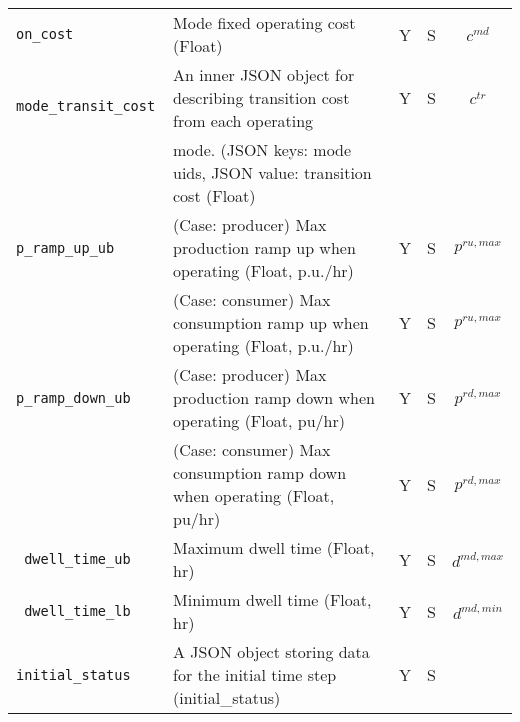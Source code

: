 \documentclass{article}
\begin{document}
\begin{center}
\begin{tabular}{ l | l | c | c | c |}
  {\tt on\_cost} & Mode fixed operating cost (Float) & Y & S & $c^{md}$\\
  {\tt\color{red} mode\_transit\_cost} & An inner JSON object for describing transition cost from each operating  & Y & S & $c^{tr}$ \\
     & mode. (JSON keys: mode uids, JSON value: transition cost (Float) &  &  &  \\
  {\tt p\_ramp\_up\_ub}     & {(Case: producer) Max production ramp up when operating (Float, p.u./hr)} & Y & S & $p^{ru,max}$ \\
                            & {(Case: consumer) Max consumption ramp up when operating (Float, p.u./hr)} & Y & S & $p^{ru,max}$ \\
  {\tt p\_ramp\_down\_ub}   & {(Case: producer) Max production ramp down when operating (Float, pu/hr)} & Y & S & $p^{rd,max}$ \\
                            & {(Case: consumer) Max consumption ramp down when operating (Float, pu/hr)} & Y & S & $p^{rd,max}$ \\
  {\tt\color{red} dwell\_time\_ub}          & Maximum dwell time (Float, hr) & Y & S &  $d^{md,max}$\\                            
  {\tt\color{red} dwell\_time\_lb}          & Minimum dwell time (Float, hr) & Y & S &  $d^{md,min}$\\                              
  {\tt initial\_status}          & A JSON object storing data for the initial time step (initial\_status) & Y & S &  \\
  \hline
\end{tabular}
\end{center}
\end{document}
